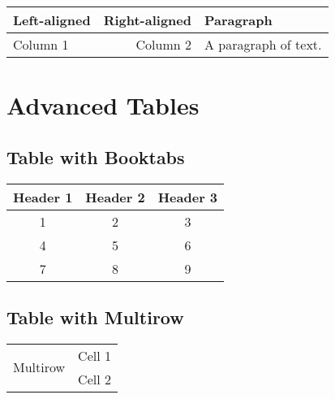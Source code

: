 \documentclass{article}
\begin{document}
\begin{tabular}{|l|r|p{3cm}|}
\hline
Left-aligned & Right-aligned & Paragraph \\
\hline
Column 1 & Column 2 & A paragraph of text. \\
\hline
\end{tabular}

\section{Advanced Tables}

\subsection{Table with Booktabs}

\begin{tabular}{ccc}
\toprule
Header 1 & Header 2 & Header 3 \\
\midrule
1 & 2 & 3 \\
4 & 5 & 6 \\
7 & 8 & 9 \\
\bottomrule
\end{tabular}

\subsection{Table with Multirow}

\begin{tabular}{cc}
\hline
\multirow{2}{*}{Multirow} & Cell 1 \\
& Cell 2 \\
\hline
\end{tabular}
\end{document}
